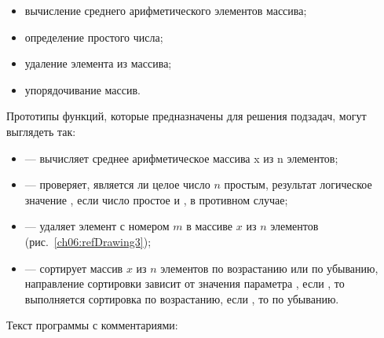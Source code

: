 \begin{itemize}
\item вычисление среднего арифметического элементов массива;
\item определение простого числа;
\item удаление элемента из массива;
\item упорядочивание массив.
\end{itemize}
Прототипы функций, которые предназначены для решения подзадач, могут выглядеть так:

\begin{itemize}
\item {} --- вычисляет среднее арифметическое массива x из n элементов;
\item {} --- проверяет, является ли целое число $n$ простым, результат логическое значение
, если число простое и , в противном случае;
\item {} --- удаляет элемент с номером $m$ в массиве $x$ из $n$ элементов (рис.~\ref{ch06:refDrawing3});%
\item {} --- сортирует массив $x$ из $n$ элементов
по возрастанию или по убыванию, направление сортировки зависит от значения параметра , если
, то выполняется сортировка по возрастанию, если , то по убыванию.
\end{itemize}
Текст программы с комментариями:
